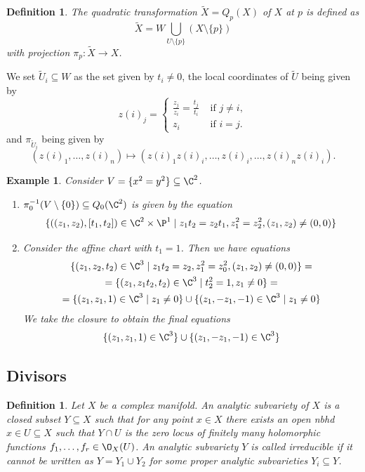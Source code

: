\documentclass[A4paper, british]{amsart}
\theoremstyle{darkgreentheorem}
\theoremstyle{darkbluedefinition}
\newtheorem{defn}[thm]{Definition}
\theoremstyle{darkredexample}
\newtheorem{exa}[thm]{Example}
\theoremstyle{remark}
\newcommand{\1}{\mathbbm{1}}
\newcommand{\tms}{\times}
\newcommand{\sub}{\subseteq}
\begin{document}
\begin{defn}
    The \textit{quadratic transformation} $\tilde{X}=Q_{p}(X)$ of $X$ at $p$ is defined as
    \[ \tilde{X}=W\bigcup_{U\setminus \{p\}}(X\setminus \{p\}) \]
    with projection $\pi_{p}\colon \tilde{X}\to X$.
\end{defn}

We set $\tilde{U}_{i}\sub W$ as the set given by $t_{i}\neq 0$, the local coordinates of $\tilde{U}$ being given by
\[ z(i)_{j}=\begin{cases} \frac{z_{j}}{z_{i}}=\frac{t_{j}}{t_{i}} & \text{ if } j\neq i, \\ z_{i} &\text{ if } i=j.\end{cases} \]
and $\pi_{\tilde{U}_{i}}$ being given by
\[(z(i)_{1},\ldots,z(i)_{n})\mapsto (z(i)_{1}z(i)_{i},\ldots,z(i)_{i},\ldots,z(i)_{n}z(i)_{i}).\]

\begin{exa}
    Consider $V=\{ x^{2}=y^{2}\}\sub \C^{2}$.
    \begin{enumerate}
	\item $\pi_{0}^{-1}(V\setminus \{0\})\sub Q_{0}(\C^{2})$ is given by the equation
	    \[ \{ ((z_{1},z_{2}),[t_{1},t_{2}])\in \C^{2}\tms \P^{1}\mid z_{1}t_{2}=z_{2}t_{1},z_{1}^{2}=z_{2}^{2},(z_{1},z_{2})\neq (0,0)\} \]
	\item Consider the affine chart with $t_{1}=1$.
	    Then we have equations
	    \begin{multline*}
		\{(z_{1},z_{2},t_{2})\in \C^{3}\mid z_{1}t_{2}=z_{2},z_{1}^{2}=z_{0}^{2},(z_{1},z_{2})\neq (0,0) \} =\\  =\{ (z_{1},z_{1}t_{2},t_{2})\in \C^{3}\mid t_{2}^{2}=1,z_{1}\neq 0\} =\\
		=\{ (z_{1},z_{1},1)\in \C^{3}\mid z_{1}\neq 0 \} \cup \{(z_{1},-z_{1},-1)\in \C^{3}\mid z_{1}\neq 0\}
	    \end{multline*}
	    We take the closure to obtain the final equations
	    \[ \{(z_{1},z_{1},1)\in \C^{3}\}\cup \{(z_{1},-z_{1},-1)\in \C^{3}\} \]
    \end{enumerate}
\end{exa}

\subsection{Divisors}

\begin{defn}
    Let $X$ be a complex manifold.
    An \textit{analytic subvariety} of $X$ is a closed subset $Y\sub X$ such that for any point $x\in X$ there exists an open nbhd $x\in U\sub X$ such that $Y\cap U$ is the zero locus of finitely many holomorphic functions $f_{1},\ldots,f_{r}\in \O_{X}(U)$.
    An analytic subvariety $Y$ is called \textit{irreducible} if it cannot be written as $Y=Y_{1}\cup Y_{2}$ for some proper analytic subvarieties $Y_{i}\sub Y$.
\end{defn}
\end{document}
